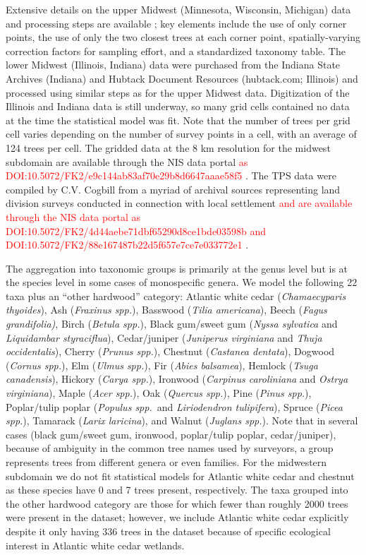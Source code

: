 \documentclass[10pt,letterpaper]{article}
\begin{document}
Extensive details on the upper Midwest (Minnesota, Wisconsin, Michigan)
data and processing steps are available \cite{goring2015composition};
key elements include the use of only corner points, the use of only
the two closest trees at each corner point, spatially-varying correction
factors for sampling effort, and a standardized taxonomy table. The
lower Midwest (Illinois, Indiana) data were purchased from the Indiana
State Archives (Indiana) and Hubtack Document Resources (hubtack.com;
Illinois) and processed using similar steps as for the upper Midwest
data. Digitization of the Illinois and Indiana data is still underway,
so many grid cells contained no data at the time the statistical model
was fit. Note that the number of trees per grid cell varies depending
on the number of survey points in a cell, with an average of 124 trees
per cell. The gridded data at the 8 km resolution for the midwest
subdomain are available through the NIS data portal \textcolor{red}{as
DOI:10.5072/FK2/e9c144ab83af70e29b8d6647aaae58f5} \textcolor{red}{\cite{Gori:etal:data:2016}}.
The TPS data were compiled by C.V. Cogbill from a myriad of archival
sources representing land division surveys conducted in connection
with local settlement\textcolor{red}{{} and are available through the
NIS data portal as DOI:10.5072/FK2/4d44aebe71dbf65290d8ce1bde03598b
and DOI:10.5072/FK2/88e167487b22d5f657e7ce7e033772e1 \cite{Cogb:dataNE:2016,Cogb:dataOH:2016}}. 

The aggregation into taxonomic groups is primarily at the genus level
but is at the species level in some cases of monospecific genera.
We model the following 22 taxa plus an ``other hardwood'' category:
Atlantic white cedar (\emph{Chamaecyparis thyoides}), Ash (\emph{Fraxinus
spp.}), Basswood (\emph{Tilia americana}), Beech (\emph{Fagus grandifolia)},
Birch (\emph{Betula spp.}), Black gum/sweet gum (\emph{Nyssa sylvatica}
and \emph{Liquidambar styraciflua}), Cedar/juniper (\emph{Juniperus
virginiana} and \emph{Thuja occidentalis}), Cherry (\emph{Prunus spp.}),
Chestnut (\emph{Castanea dentata}), Dogwood (\emph{Cornus spp.}),
Elm (\emph{Ulmus spp.}), Fir (\emph{Abies balsamea}), Hemlock (\emph{Tsuga
canadensis}), Hickory (\emph{Carya spp.}), Ironwood (\emph{Carpinus
caroliniana} and \emph{Ostrya virginiana}), Maple (\emph{Acer spp.}),
Oak (\emph{Quercus spp.}), Pine (\emph{Pinus spp.}), Poplar/tulip
poplar (\emph{Populus spp.}~and \emph{Liriodendron tulipifera}),
Spruce (\emph{Picea spp.}), Tamarack (\emph{Larix laricina}), and
Walnut (\emph{Juglans spp.}). Note that in several cases (black gum/sweet
gum, ironwood, poplar/tulip poplar, cedar/juniper), because of ambiguity
in the common tree names used by surveyors, a group represents trees
from different genera or even families. For the midwestern subdomain
we do not fit statistical models for Atlantic white cedar and chestnut
as these species have 0 and 7 trees present, respectively. The taxa
grouped into the other hardwood category are those for which fewer
than roughly 2000 trees were present in the dataset; however, we include
Atlantic white cedar explicitly despite it only having 336 trees in
the dataset because of specific ecological interest in Atlantic white
cedar wetlands. 
\end{document}
